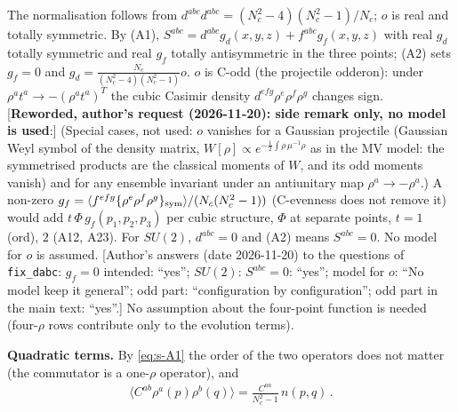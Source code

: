 {The normalisation follows from $d^{abc}d^{abc}=(N_{c}^{2}-4)(N_{c}^{2}-1)/N_{c}$; $o$ is real and totally symmetric. By (A1), $S^{abc}=d^{abc}g_{d}(x,y,z)+f^{abc}g_{f}(x,y,z)$ with real $g_{d}$ totally symmetric and real $g_{f}$ totally antisymmetric in the three points; (A2) sets $g_{f}=0$ and $g_{d}=\frac{N_{c}}{(N_{c}^{2}-4)(N_{c}^{2}-1)}o$. $o$ is C-odd (the projectile odderon): under $\rho^{a}t^{a}\to-(\rho^{a}t^{a})^{T}$ the cubic Casimir density $d^{efg}\rho^{e}\rho^{f}\rho^{g}$ changes sign. [\textbf{Reworded, author's request (2026-11-20): side remark only, no model is used}:] (Special cases, not used: $o$ vanishes for a Gaussian projectile (Gaussian Weyl symbol of the density matrix, $W[\rho]\propto e^{-\frac12\int\rho\,\mu^{-1}\rho}$ as in the MV model: the symmetrised products are the classical moments of $W$, and its odd moments vanish) and for any ensemble invariant under an antiunitary map $\rho^{a}\to-\rho^{a}$.) A non-zero $g_{f}=\langle f^{efg}\{\rho^{e}\rho^{f}\rho^{g}\}_{\rm sym}\rangle/(N_{c}(N_{c}^{2}-1))$ (C-evenness does not remove it) would add $t\,\Phi\,g_{f}(p_{1},p_{2},p_{3})$ per cubic structure, $\Phi$ at separate points, $t=1$ (ord), $2$ (A12, A23). For $SU(2)$, $d^{abc}=0$ and (A2) means $S^{abc}=0$. No model for $o$ is assumed. [Author's answers (date 2026-11-20) to the questions of \texttt{fix\_dabc}: $g_{f}=0$ intended: ``yes''; $SU(2)$: $S^{abc}=0$: ``yes''; model for $o$: ``No model keep it general''; odd part: ``configuration by configuration''; odd part in the main text: ``yes''.] No assumption about the four-point function is needed (four-$\rho$ rows contribute only to the evolution terms).

\noindent\textbf{Quadratic terms.} By \eqref{eq:s-A1} the order of the two operators does not matter (the commutator is a one-$\rho$ operator), and
\begin{align}
\langle C^{ab}\rho^{a}(p)\rho^{b}(q)\rangle=\frac{C^{aa}}{N_{c}^{2}-1}\,n(p,q)\,.\label{eq:s-quad}
\end{align}

}
